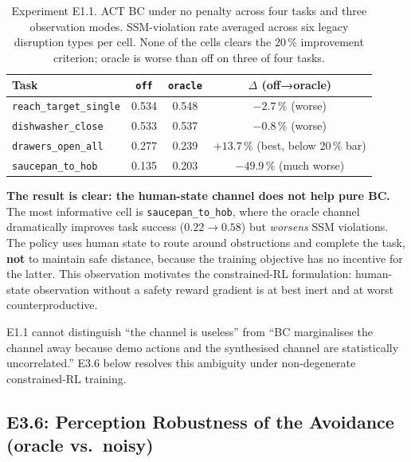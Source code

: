 \documentclass[11pt,a4paper]{report}
\newcommand{\ssm}{SSM}
\begin{document}
\begin{table}[h]
\centering
\caption{Experiment E1.1. ACT BC under no penalty across four tasks
and three observation modes. SSM-violation rate averaged across six
legacy disruption types per cell. None of the cells clears the
20\,\% improvement criterion; oracle is worse than off on three of
four tasks.}
\label{tab:e1.1-bc-ablation}
\small
\begin{tabular}{lccc}
\toprule
Task & \texttt{off} & \texttt{oracle} & $\Delta$ (off→oracle) \\
\midrule
\texttt{reach\_target\_single} & 0.534 & 0.548 & $-2.7\,\%$ (worse) \\
\texttt{dishwasher\_close}     & 0.533 & 0.537 & $-0.8\,\%$ (worse) \\
\texttt{drawers\_open\_all}    & 0.277 & 0.239 & $+13.7\,\%$ (best, below 20\,\% bar) \\
\texttt{saucepan\_to\_hob}     & 0.135 & 0.203 & $-49.9\,\%$ (much worse) \\
\bottomrule
\end{tabular}
\end{table}

\textbf{The result is clear: the human-state channel does not help
pure BC.} The most informative cell is \texttt{saucepan\_to\_hob},
where the oracle channel dramatically improves task success
($0.22 \to 0.58$) but \emph{worsens} \ssm{} violations. The policy
uses human state to route around obstructions and complete the
task, \textbf{not} to maintain safe distance, because the
training objective has no incentive for the latter. This observation
motivates the constrained-RL formulation: human-state observation
without a safety reward gradient is at best inert and at worst
counterproductive.

E1.1 cannot distinguish ``the channel is useless'' from ``BC
marginalises the channel away because demo actions and the
synthesised channel are statistically uncorrelated.'' E3.6 below
resolves this ambiguity under non-degenerate constrained-RL
training.

\subsection{E3.6: Perception Robustness of the Avoidance (oracle vs.\ noisy)}
\label{sec:results:obs-rl}
\end{document}

